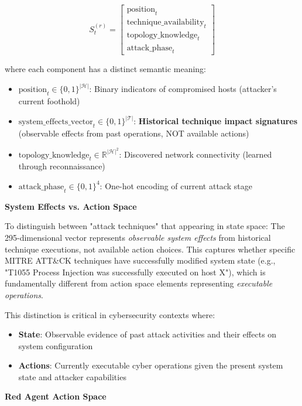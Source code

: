 \documentclass[12pt,oneside]{article}
\begin{document}
\begin{equation}
S^{(r)}_t = \begin{bmatrix}
\text{position}_t \\
\text{technique\_availability}_t \\
\text{topology\_knowledge}_t \\
\text{attack\_phase}_t
\end{bmatrix}
\end{equation}

where each component has a distinct semantic meaning:

\begin{itemize}
    \item $\text{position}_t \in \{0,1\}^{|\mathcal{H}|}$: Binary indicators of compromised hosts (attacker's current foothold)
    \item $\text{system\_effects\_vector}_t \in \{0,1\}^{|\mathcal{T}|}$: \textbf{Historical technique impact signatures} (observable effects from past operations, NOT available actions)
    \item $\text{topology\_knowledge}_t \in \mathbb{R}^{|\mathcal{H}|^2}$: Discovered network connectivity (learned through reconnaissance)
    \item $\text{attack\_phase}_t \in \{0,1\}^4$: One-hot encoding of current attack stage
\end{itemize}

\textbf{System Effects vs. Action Space}

To distinguish between "attack techniques" that appearing in state space: The 295-dimensional vector represents \textit{observable system effects} from historical technique executions, not available action choices. This captures whether specific MITRE ATT\&CK techniques have successfully modified system state (e.g., "T1055 Process Injection was successfully executed on host X"), which is fundamentally different from action space elements representing \textit{executable operations}.

This distinction is critical in cybersecurity contexts where:
\begin{itemize}
    \item \textbf{State}: Observable evidence of past attack activities and their effects on system configuration
    \item \textbf{Actions}: Currently executable cyber operations given the present system state and attacker capabilities
\end{itemize}

\textbf{Red Agent Action Space}
\end{document}
